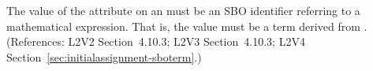 The value of the  attribute on an \InitialAssignment must be an
SBO identifier referring to a mathematical expression.  That is, the value
must be a term derived from \sbomathformula.  (References: L2V2 Section~4.10.3;
L2V3 Section~4.10.3; L2V4 Section~\ref{sec:initialassignment-sboterm}.)
